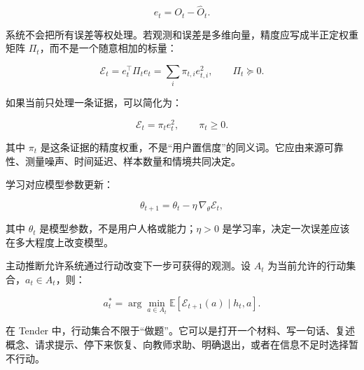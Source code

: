 \documentclass[UTF8,a4paper,11pt]{ctexart}
\begin{document}
\begin{equation}
e_t=O_t-\hat O_t.
\end{equation}

系统不会把所有误差等权处理。若观测和误差是多维向量，精度应写成半正定权重矩阵 \(\Pi_t\)，而不是一个随意相加的标量：

\begin{equation}
\mathcal E_t
=e_t^{\top}\Pi_t e_t
=\sum_i \pi_{t,i}e_{t,i}^{2},
\qquad \Pi_t\succeq 0.
\end{equation}

如果当前只处理一条证据，可以简化为：

\begin{equation}
\mathcal E_t=\pi_t e_t^2,
\qquad \pi_t\geq 0.
\end{equation}

其中 \(\pi_t\) 是这条证据的精度权重，不是“用户置信度”的同义词。它应由来源可靠性、测量噪声、时间延迟、样本数量和情境共同决定。

学习对应模型参数更新：

\begin{equation}
\theta_{t+1}
=\theta_t-\eta\,\nabla_\theta\mathcal E_t,
\end{equation}

其中 \(\theta_t\) 是模型参数，不是用户人格或能力；\(\eta>0\) 是学习率，决定一次误差应该在多大程度上改变模型。

主动推断允许系统通过行动改变下一步可获得的观测。设 \(A_t\) 为当前允许的行动集合，\(a_t\in A_t\)，则：

\begin{equation}
a_t^\ast
=\arg\min_{a\in A_t}
\mathbb E\left[
\mathcal E_{t+1}(a)\mid h_t,a
\right].
\end{equation}

在 Tender 中，行动集合不限于“做题”。它可以是打开一个材料、写一句话、复述概念、请求提示、停下来恢复、向教师求助、明确退出，或者在信息不足时选择暂不行动。
\end{document}
